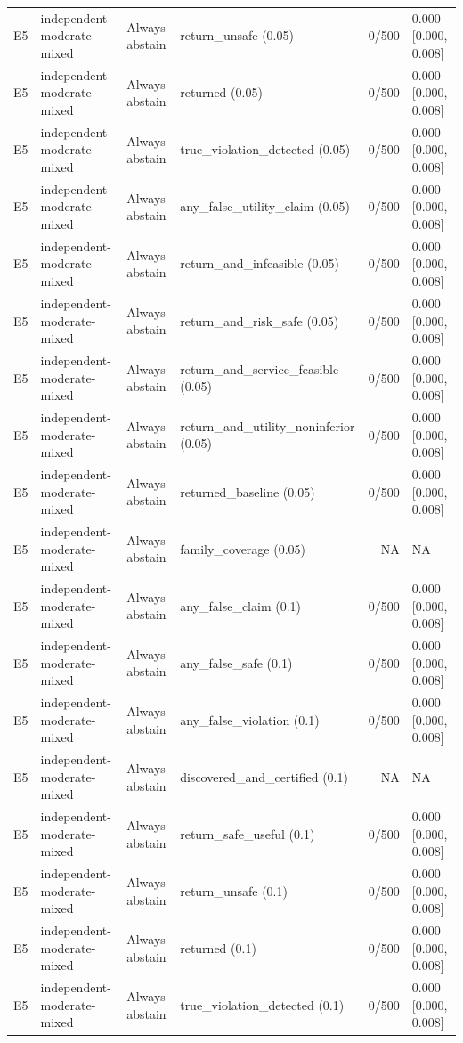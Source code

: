 \begin{longtable}{p{.04\linewidth}p{.18\linewidth}p{.19\linewidth}p{.16\linewidth}r p{.21\linewidth}}
E5 & independent-moderate-mixed & Always abstain & return\_unsafe (0.05) & 0/500 & 0.000 [0.000, 0.008]\\
E5 & independent-moderate-mixed & Always abstain & returned (0.05) & 0/500 & 0.000 [0.000, 0.008]\\
E5 & independent-moderate-mixed & Always abstain & true\_violation\_detected (0.05) & 0/500 & 0.000 [0.000, 0.008]\\
E5 & independent-moderate-mixed & Always abstain & any\_false\_utility\_claim (0.05) & 0/500 & 0.000 [0.000, 0.008]\\
E5 & independent-moderate-mixed & Always abstain & return\_and\_infeasible (0.05) & 0/500 & 0.000 [0.000, 0.008]\\
E5 & independent-moderate-mixed & Always abstain & return\_and\_risk\_safe (0.05) & 0/500 & 0.000 [0.000, 0.008]\\
E5 & independent-moderate-mixed & Always abstain & return\_and\_service\_feasible (0.05) & 0/500 & 0.000 [0.000, 0.008]\\
E5 & independent-moderate-mixed & Always abstain & return\_and\_utility\_noninferior (0.05) & 0/500 & 0.000 [0.000, 0.008]\\
E5 & independent-moderate-mixed & Always abstain & returned\_baseline (0.05) & 0/500 & 0.000 [0.000, 0.008]\\
E5 & independent-moderate-mixed & Always abstain & family\_coverage (0.05) & NA & NA\\
E5 & independent-moderate-mixed & Always abstain & any\_false\_claim (0.1) & 0/500 & 0.000 [0.000, 0.008]\\
E5 & independent-moderate-mixed & Always abstain & any\_false\_safe (0.1) & 0/500 & 0.000 [0.000, 0.008]\\
E5 & independent-moderate-mixed & Always abstain & any\_false\_violation (0.1) & 0/500 & 0.000 [0.000, 0.008]\\
E5 & independent-moderate-mixed & Always abstain & discovered\_and\_certified (0.1) & NA & NA\\
E5 & independent-moderate-mixed & Always abstain & return\_safe\_useful (0.1) & 0/500 & 0.000 [0.000, 0.008]\\
E5 & independent-moderate-mixed & Always abstain & return\_unsafe (0.1) & 0/500 & 0.000 [0.000, 0.008]\\
E5 & independent-moderate-mixed & Always abstain & returned (0.1) & 0/500 & 0.000 [0.000, 0.008]\\
E5 & independent-moderate-mixed & Always abstain & true\_violation\_detected (0.1) & 0/500 & 0.000 [0.000, 0.008]\\

\end{longtable}
